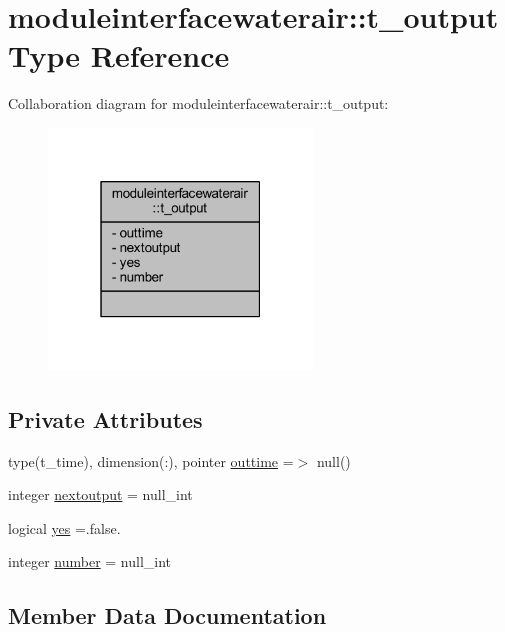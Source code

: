 \hypertarget{structmoduleinterfacewaterair_1_1t__output}{}\section{moduleinterfacewaterair\+:\+:t\+\_\+output Type Reference}
\label{structmoduleinterfacewaterair_1_1t__output}


Collaboration diagram for moduleinterfacewaterair\+:\+:t\+\_\+output\+:\nopagebreak
\begin{figure}[H]
\begin{center}
\leavevmode
\includegraphics[width=199pt]{structmoduleinterfacewaterair_1_1t__output__coll__graph}
\end{center}
\end{figure}
\subsection*{Private Attributes}
\begin{DoxyCompactItemize}
\item 
type(t\+\_\+time), dimension(\+:), pointer \mbox{\hyperlink{structmoduleinterfacewaterair_1_1t__output_aadd52e34370918c62b9812171d1d1dab}{outtime}} =$>$ null()
\item 
integer \mbox{\hyperlink{structmoduleinterfacewaterair_1_1t__output_ad2e89dfe24a1d4ca6bdbaa376e18e60f}{nextoutput}} = null\+\_\+int
\item 
logical \mbox{\hyperlink{structmoduleinterfacewaterair_1_1t__output_a9a72a3a3759c01d3b356e80cfd32f099}{yes}} =.false.
\item 
integer \mbox{\hyperlink{structmoduleinterfacewaterair_1_1t__output_ab509a1944714f109593af836fc852ff4}{number}} = null\+\_\+int
\end{DoxyCompactItemize}


\subsection{Member Data Documentation}
\mbox{\label{structmoduleinterfacewaterair_1_1t__output_ad2e89dfe24a1d4ca6bdbaa376e18e60f}} 
